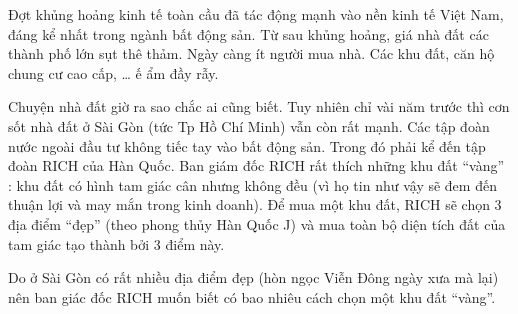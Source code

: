 Đợt khủng hoảng kinh tế toàn cầu đã tác động mạnh vào nền kinh tế Việt Nam, đáng kể nhất trong ngành bất động sản. Từ sau khủng hoảng, giá nhà đất các thành phố lớn sụt thê thảm. Ngày càng ít người mua nhà. Các khu đất, căn hộ chung cư cao cấp, … ế ẩm đầy rẫy.  

   Chuyện nhà đất giờ ra sao chắc ai cũng biết. Tuy nhiên chỉ vài năm trước thì cơn sốt nhà đất ở Sài Gòn (tức Tp Hồ Chí Minh) vẫn còn rất mạnh. Các tập đoàn nước ngoài đầu tư không tiếc tay vào bất động sản. Trong đó phải kể đến tập đoàn RICH của Hàn Quốc. Ban giám đốc RICH rất thích những khu đất “vàng” : khu đất có hình tam giác cân nhưng không đều (vì họ tin như vậy sẽ đem đến thuận lợi và may mắn trong kinh doanh). Để mua một khu đất, RICH sẽ chọn 3 địa điểm “đẹp” (theo phong thủy Hàn Quốc J) và mua toàn bộ diện tích đất của tam giác tạo thành bởi 3 điểm này.  

   Do ở Sài Gòn có rất nhiều địa điểm đẹp (hòn ngọc Viễn Đông ngày xưa mà lại) nên ban giác đốc RICH muốn biết có bao nhiêu cách chọn một khu đất “vàng”.